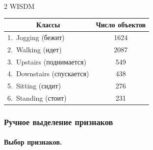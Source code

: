 \begin{multicols}{2}
{{  WISDM}}





{\small


\begin{center}


   \tabcolsep=14pt


  \begin{tabular}{|l|c|}


    \hline


    \multicolumn{1}{|c|}{Классы} & Число объектов\\


    \hline


    1.\ Jogging (бежит) &  1624\hphantom{9}\\


    2.\ Walking (идет) &  2087\hphantom{9}\\


    3.\ Upstairs (поднимается)& 549\\


    4.\ Downstairs (спускается)& 438\\


    5.\ Sitting (сидит) & 276\\


    6.\ Standing (стоит)& 231\\


     \hline


  \end{tabular}


  \end{center}}


  


  \addtocounter{table}{1}







\subsubsection{Ручное выделение признаков}





\paragraph*{Выбор признаков.}





\end{multicols}
